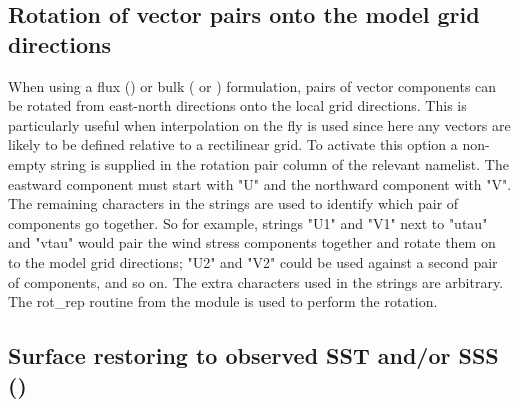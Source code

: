 \documentclass[../tex_main/NEMO_manual]{subfiles}
\begin{document}
\subsection{Rotation of vector pairs onto the model grid directions}
\label{subsec:SBC_rotation}

When using a flux () or bulk ( or ) formulation, 
pairs of vector components can be rotated from east-north directions onto the local grid directions.  
This is particularly useful when interpolation on the fly is used since here any vectors are likely to be defined 
relative to a rectilinear grid.
To activate this option a non-empty string is supplied in the rotation pair column of the relevant namelist.
The eastward component must start with "U" and the northward component with "V".  
The remaining characters in the strings are used to identify which pair of components go together.
So for example, strings "U1" and "V1" next to "utau" and "vtau" would pair the wind stress components together
and rotate them on to the model grid directions; "U2" and "V2" could be used against a second pair of components, 
and so on.
The extra characters used in the strings are arbitrary.
The rot\_rep routine from the  module is used to perform the rotation.

\subsection{Surface restoring to observed SST and/or SSS (\protect{})}
\label{subsec:SBC_ssr}
\end{document}
